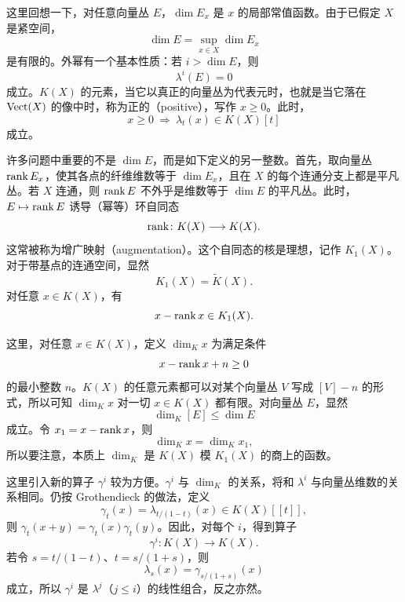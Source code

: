 这里回想一下，对任意向量丛 $E$，$\dim E_x$ 是 $x$ 的局部常值函数。由于已假定 $X$ 是紧空间，
\[
\dim E=\sup_{x\in X}\dim E_x
\]
是有限的。外幂有一个基本性质：若 $i>\dim E$，则
\[
\lambda^i(E)=0
\]
成立。$K(X)$ 的元素，当它以真正的向量丛为代表元时，也就是当它落在 $\operatorname{Vect}(X)$ 的像中时，称为正的（positive），写作 $x\ge 0$。此时，
\[
x\ge 0\ \Longrightarrow\ \lambda_t(x)\in K(X)[t]
\]
成立。


许多问题中重要的不是 $\dim E$，而是如下定义的另一整数。首先，取向量丛 $\operatorname{rank} E_x$，使其各点的纤维维数等于 $\dim E_x$，且在 $X$ 的每个连通分支上都是平凡丛。若 $X$ 连通，则 $\operatorname{rank} E$ 不外乎是维数等于 $\dim E$ 的平凡丛。此时，$E\mapsto\operatorname{rank} E$ 诱导（幂等）环自同态
\[
\operatorname{rank}\colon K(X)\longrightarrow K(X).
\]
这常被称为增广映射（augmentation）。这个自同态的核是理想，记作 $K_1(X)$。对于带基点的连通空间，显然
\[
K_1(X)=\tilde K(X).
\]
对任意 $x\in K(X)$，有
\[
x-\operatorname{rank} x\in K_1(X).
\]


这里，对任意 $x\in K(X)$，定义 $\dim_K x$ 为满足条件
\[
x-\operatorname{rank} x+n\ge 0
\]
的最小整数 $n$。$K(X)$ 的任意元素都可以对某个向量丛 $V$ 写成 $[V]-n$ 的形式，所以可知 $\dim_K x$ 对一切 $x\in K(X)$ 都有限。对向量丛 $E$，显然
\[
\dim_K[E]\le\dim E
\]
成立。令 $x_1=x-\operatorname{rank} x$，则
\[
\dim_K x=\dim_K x_1,
\]
所以要注意，本质上 $\dim_K$ 是 $K(X)$ 模 $K_1(X)$ 的商上的函数。

这里引入新的算子 $\gamma^i$ 较为方便。$\gamma^i$ 与 $\dim_K$ 的关系，将和 $\lambda^i$ 与向量丛维数的关系相同。仍按 Grothendieck 的做法，定义
\[
\gamma_t(x)=\lambda_{t/(1-t)}(x)\in K(X)[[t]],
\]
则 $\gamma_t(x+y)=\gamma_t(x)\gamma_t(y)$。因此，对每个 $i$，得到算子
\[
\gamma^i\colon K(X)\longrightarrow K(X).
\]
若令 $s=t/(1-t)$、$t=s/(1+s)$，则
\[
\lambda_s(x)=\gamma_{s/(1+s)}(x)
\]
成立，所以 $\gamma^i$ 是 $\lambda^j$（$j\le i$）的线性组合，反之亦然。

